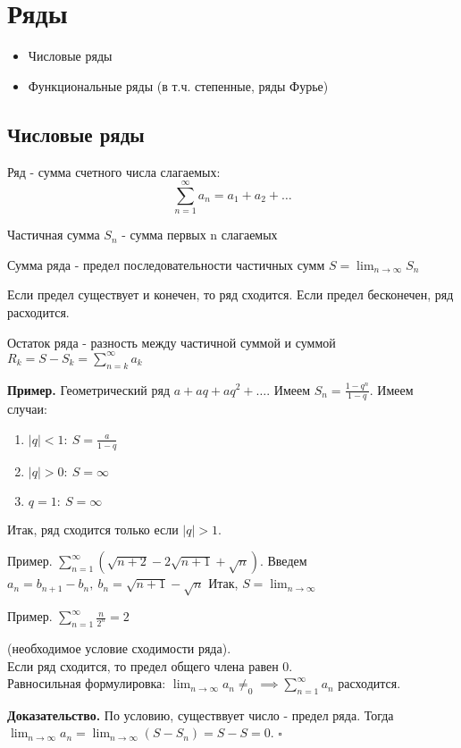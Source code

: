 \section{Ряды}
\begin{itemize}
    \item Числовые ряды
    \item Функциональные ряды (в т.ч. степенные, ряды Фурье)
\end{itemize}

\subsection{Числовые ряды}
\begin{defin}
Ряд - сумма счетного числа слагаемых: $$\sum_{n=1}^{\infty} a_n =a_1+a_2+
\ldots$$
\end{defin}
\begin{defin}
Частичная сумма $S_n$ - сумма первых n слагаемых
\end{defin}
\begin{defin}
Сумма ряда - предел последовательности частичных сумм $S=\lim_{n \to \infty} 
S_n$
\end{defin}
Если предел существует и конечен, то ряд сходится. Если предел бесконечен, ряд 
расходится.
\begin{defin}
Остаток ряда - разность между частичной суммой и суммой $R_k=S-S_k=
\sum_{n=k}^{\infty} a_k $
\end{defin}
\textbf{Пример.} Геометрический ряд $a+aq+aq^2+\ldots$. Имеем $S_n=\frac{1-q^n
}{1-q}$. Имеем случаи:
\begin{enumerate}
    \item $|q|<1:~S=\frac{a}{1-q}$ 
    \item $|q|>0:~S=\infty$
    \item $q=1:~S=\infty$
\end{enumerate}
Итак, ряд сходится только если $|q|>1$.

Пример. $\sum_{n=1}^{\infty} (\sqrt{n+2} -2\sqrt{n+1} +\sqrt{n} )$.
Введем $a_n=b_{n+1}-b_n,~b_n=\sqrt{n+1}-\sqrt{n}$ 
Итак, $S=\lim_{n \to \infty} $

Пример. $\sum_{n=1}^{\infty} \frac{n}{2^n}=2$
\begin{theor}
    (необходимое условие сходимости ряда). \\ Если ряд сходится, то предел
    общего члена равен 0.\\
    Равносильная формулировка: $\lim_{n \to \infty}a_n\ne_0\implies \sum_{n=1}^{\infty} a_n $ расходится.
\end{theor}
\textbf{Доказательство.} По условию, существвует число - предел ряда.
Тогда $\lim_{n \to \infty}a_n=\lim_{n \to \infty}(S-S_n)=S-S=0$.
$\square$ 

